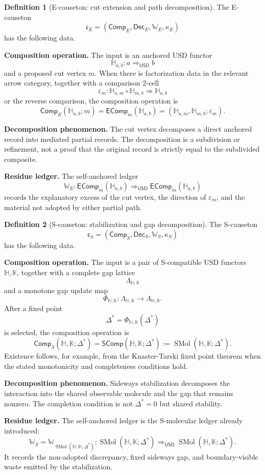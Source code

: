 \documentclass[11pt]{article}
\newcommand{\USD}{\mathsf{USD}}
\newcommand{\defeq}{\mathrel{:=}}
\newcommand{\EComp}{\mathsf{EComp}}
\newcommand{\SComp}{\mathsf{SComp}}
\newcommand{\Comp}{\mathsf{Comp}}
\newcommand{\Dec}{\mathsf{Dec}}
\theoremstyle{definition}
\newtheorem{definition}{Definition}[section]
\theoremstyle{plain}
\begin{document}
\begin{definition}[E-causeton: cut extension and path decomposition]
The E-causeton
\[
  \mathfrak c_E
  =
  (\Comp_E,\Dec_E,\mathbb W_E,\kappa_E)
\]
has the following data.

\textbf{Composition operation.}  The input is an anchored USD functor
\[
  \mathbb H_{a,b}:a\Rightarrow_{\USD}b
\]
and a proposed cut vertex $m$.  When there is factorization data in the
relevant arrow category, together with a comparison 2-cell
\[
  \varepsilon_m:
  \mathbb H_{a,m}\circ \mathbb H_{m,b}
  \Rightarrow
  \mathbb H_{a,b}
\]
or the reverse comparison, the composition operation is
\[
  \Comp_E(\mathbb H_{a,b};m)
  =
  \EComp_m(\mathbb H_{a,b})
  =
  (\mathbb H_{a,m},\mathbb H_{m,b};\varepsilon_m).
\]

\textbf{Decomposition phenomenon.}  The cut vertex decomposes a direct
anchored record into mediated partial records.  The decomposition is a
subdivision or refinement, not a proof that the original record is
strictly equal to the subdivided composite.

\textbf{Residue ledger.}  The self-anchored ledger
\[
  \mathbb W_E:
  \EComp_m(\mathbb H_{a,b})
  \Rightarrow_{\USD}
  \EComp_m(\mathbb H_{a,b})
\]
records the explanatory excess of the cut vertex, the direction of
$\varepsilon_m$, and the material not adopted by either partial path.
\end{definition}

\begin{definition}[S-causeton: stabilization and gap decomposition]
The S-causeton
\[
  \mathfrak c_S
  =
  (\Comp_S,\Dec_S,\mathbb W_S,\kappa_S)
\]
has the following data.

\textbf{Composition operation.}  The input is a pair of S-compatible USD
functors $\mathbb H,\mathbb K$, together with a complete gap lattice
\[
  \Lambda_{\mathbb H,\mathbb K}
\]
and a monotone gap update map
\[
  \Phi_{\mathbb H,\mathbb K}:
  \Lambda_{\mathbb H,\mathbb K}\to
  \Lambda_{\mathbb H,\mathbb K}.
\]
After a fixed point
\[
  \Delta^*=\Phi_{\mathbb H,\mathbb K}(\Delta^*)
\]
is selected, the composition operation is
\[
  \Comp_S(\mathbb H,\mathbb K;\Delta^*)
  =
  \SComp(\mathbb H,\mathbb K;\Delta^*)
  \defeq
  \operatorname{SMol}(\mathbb H,\mathbb K;\Delta^*).
\]
Existence follows, for example, from the Knaster-Tarski fixed point
theorem when the stated monotonicity and completeness conditions hold.

\textbf{Decomposition phenomenon.}  Sideways stabilization decomposes the
interaction into the shared observable molecule and the gap that remains
nonzero.  The completion condition is not $\Delta^*=0$ but shared
stability.

\textbf{Residue ledger.}  The self-anchored ledger is the
S-molecular ledger already introduced:
\[
  \mathbb W_S
  =
  \mathbb W_{\operatorname{SMol}(\mathbb H,\mathbb K;\Delta^*)}:
  \operatorname{SMol}(\mathbb H,\mathbb K;\Delta^*)
  \Rightarrow_{\USD}
  \operatorname{SMol}(\mathbb H,\mathbb K;\Delta^*).
\]
It records the non-adopted discrepancy, fixed sideways gap, and
boundary-visible waste emitted by the stabilization.
\end{definition}
\end{document}
